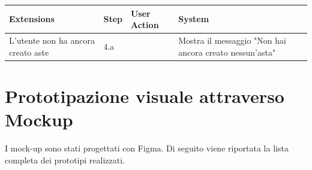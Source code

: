 \begin{table}[H]
\begin{tabularx}{\linewidth}{|p{135pt}|p{25pt}|>{\raggedright\arraybackslash}X|>{\raggedright\arraybackslash}X|}
		\hline \rowcolor[HTML]{DCDCDC}
		\textbf{\sffamily Extensions}                                 & \textbf{\sffamily Step}                                                                                                                                              & \textbf{\sffamily User Action}                                                                                                           & \textbf{\sffamily System}                               \\
		\hline\multirow{2}{135pt}{L'utente non ha ancora creato aste} & 4.a                                                                                                                                                                  &                                                                                                                                          & Mostra il messaggio "Non hai ancora creato nessun'asta" \\

		\hline
	\end{tabularx}
\end{table}

\newpage

\section{Prototipazione visuale attraverso Mockup}
I mock-up sono stati progettati con Figma. Di seguito viene riportata la lista completa dei prototipi realizzati.

